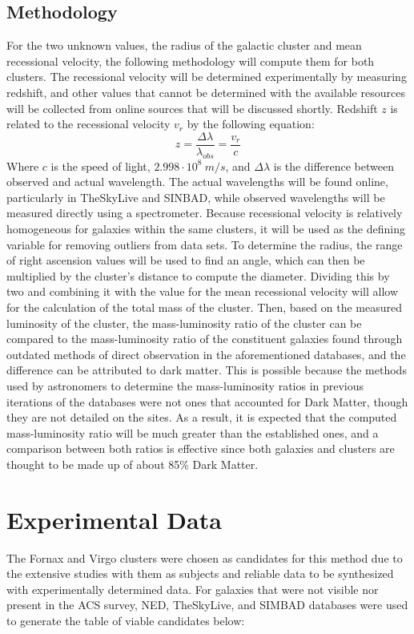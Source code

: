 \documentclass[12pt]{article}
\begin{document}
\subsection{Methodology}
For the two unknown values, the radius of the galactic cluster and mean recessional velocity, the following methodology will compute them for both clusters. The recessional velocity will be determined experimentally by measuring redshift, and other values that cannot be determined with the available resources will be collected from online sources that will be discussed shortly. Redshift $z$ is related to the recessional velocity $v_r$ by the following equation:
\begin{equation}\label{eq:redshift}
    z = \frac{\Delta \lambda}{\lambda_{obs}} = \frac{v_r}{c}
\end{equation}
Where $c$ is the speed of light, $2.998 \cdot 10^8 \: m/s$, and $\Delta \lambda$ is the difference between observed and actual wavelength. The actual wavelengths will be found online, particularly in TheSkyLive and SINBAD, while observed wavelengths will be measured directly using a spectrometer\cite{TheSky}. Because recessional velocity is relatively homogeneous for galaxies within the same clusters, it will be used as the defining variable for removing outliers from data sets. To determine the radius, the range of right ascension values will be used to find an angle, which can then be multiplied by the cluster's distance to compute the diameter. Dividing this by two and combining it with the value for the mean recessional velocity will allow for the calculation of the total mass of the cluster. Then, based on the measured luminosity of the cluster, the mass-luminosity ratio of the cluster can be compared to the mass-luminosity ratio of the constituent galaxies found through outdated methods of direct observation in the aforementioned databases, and the difference can be attributed to dark matter. This is possible because the methods used by astronomers to determine the mass-luminosity ratios in previous iterations of the databases were not ones that accounted for Dark Matter, though they are not detailed on the sites. As a result, it is expected that the computed mass-luminosity ratio will be much greater than the established ones, and a comparison between both ratios is effective since both galaxies and clusters are thought to be made up of about 85\% Dark Matter.
\section{Experimental Data}
The Fornax and Virgo clusters were chosen as candidates for this method due to the extensive studies with them as subjects and reliable data to be synthesized with experimentally determined data. For galaxies that were not visible nor present in the ACS survey, NED, TheSkyLive, and SIMBAD databases were used to generate the table of viable candidates below\cite{SIMBAD}\cite{NGC}\cite{TheSky}\cite{ACSVCS_Publications_2024}:
\end{document}
